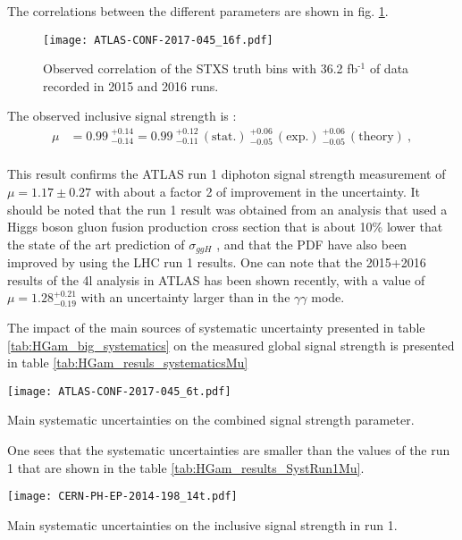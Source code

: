 The correlations between the different parameters are shown in fig. \ref{fig:org1ee6f2b}.

\begin{figure}[htbp]
\centering
\texttt{[image: ATLAS-CONF-2017-045\_16f.pdf]}
\caption{\label{fig:org1ee6f2b}
Observed correlation of the STXS truth bins with 36.2 fb\(^{\text{-1}}\) of data recorded in 2015 and 2016 runs.\cite{ATLAS-CONF-2017-045}}
\end{figure}


The observed inclusive signal strength is :
\begin{align*}
  \mu &= 0.99\ ^{+0.14}_{-0.14} = 0.99\ ^{+0.12}_{-0.11}\,\mathrm{(stat.)}\ ^{+0.06}_{-0.05}\,\mathrm{(exp.)}\ ^{+0.06}_{-0.05}\,\mathrm{(theory)} \ ,\\
\end{align*}

This result confirms the ATLAS run 1 diphoton signal strength measurement of $\mu = 1.17 \pm 0.27$ with about a factor 2 of improvement in the uncertainty.
It should be noted that the run 1 result was obtained from an analysis that used a Higgs boson gluon fusion production cross section \cite{CERN-2013-004} that is about 10\% lower that the state of the art prediction of $\sigma_{ggH}$ \cite{CERN-PH-TH-2015-055,CERN-TH-2016-006}, and that the PDF have also been improved by using the LHC run 1 results.
One can note that the 2015+2016 results of the 4l analysis in ATLAS \cite{ATLAS-CONF-2017-043} has been shown recently, with a value of $\mu=1.28^{+0.21}_{-0.19}$ with an uncertainty larger than in the $\gamma\gamma$ mode.

The impact of the main sources of systematic uncertainty presented in table \ref{tab:HGam_big_systematics} on the measured global signal strength is presented in table \ref{tab:HGam_resuls_systematicsMu}

\begin{table}
  \centering
  \texttt{[image: ATLAS-CONF-2017-045\_6t.pdf]}
  \caption{Main systematic uncertainties on the combined signal strength parameter.\cite{ATLAS-CONF-2017-045}}
  \label{tab:HGam_resuls_systematicsMu}
\end{table}

One sees that the systematic uncertainties are smaller than the values of the run 1 \cite{CERN-PH-EP-2014-198} that are shown in the table \ref{tab:HGam_results_SystRun1Mu}.


\begin{table}
  \centering
  \texttt{[image: CERN-PH-EP-2014-198\_14t.pdf]}
  \caption{Main systematic uncertainties on the inclusive signal strength in run 1. \cite{CERN-PH-EP-2014-198}}
  \label{tab:HGam_results_SystRun1Mu}
\end{table}

